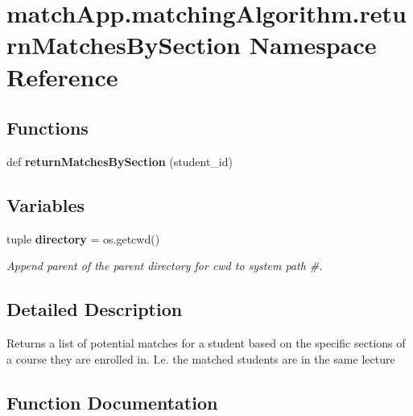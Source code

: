 \section{match\+App.\+matching\+Algorithm.\+return\+Matches\+By\+Section Namespace Reference}
\label{namespacematch_app_1_1matching_algorithm_1_1return_matches_by_section}
\subsection*{Functions}
\begin{DoxyCompactItemize}
\item 
def {\bf return\+Matches\+By\+Section} (student\+\_\+id)
\end{DoxyCompactItemize}
\subsection*{Variables}
\begin{DoxyCompactItemize}
\item 
tuple {\bf directory} = os.\+getcwd()
\begin{DoxyCompactList}\small\item\em Append parent of the parent directory for cwd to system path \#. \end{DoxyCompactList}\end{DoxyCompactItemize}


\subsection{Detailed Description}
\begin{DoxyVerb}Returns a list of potential matches for a student based on the specific sections of a course they
are enrolled in. I.e. the matched students are in the same lecture\end{DoxyVerb}
 

\subsection{Function Documentation}
